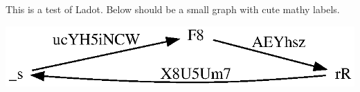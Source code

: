 \documentclass[english]{article}
\begin{document}
This is a test of Ladot. Below should be a small graph with cute
mathy labels.


\includegraphics{testfig.ps}
\end{document}
